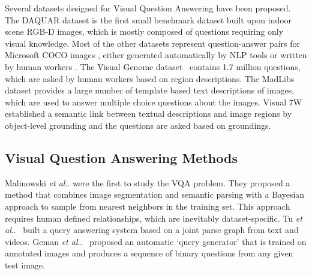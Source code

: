 \documentclass[10pt,journal]{IEEEtran}
\makeatletter
\DeclareRobustCommand\onedot{\futurelet\@let@token\@onedot}
\def\@onedot{\ifx\@let@token.\else.\null\fi\xspace}
\def\etal{\emph{et al}\onedot}
\def\bluetext{}
\makeatother
\begin{document}
Several datasets designed for Visual Question Answering have been proposed. The DAQUAR \cite{malinowski2014towards}
dataset is the first small benchmark dataset built upon indoor scene RGB-D images, which is mostly composed of questions requiring only visual knowledge. Most of the other datasets \cite{antol2015vqa,gao2015you,Yu_2015_ICCV,ren2015image,zhu2015visual7w} represent question-answer pairs for Microsoft COCO images \cite{lin2014microsoft}, either generated automatically by NLP tools \cite{ren2015image} or written by human workers \cite{antol2015vqa,gao2015you}. \bluetext{The Visual Genome dataset~\cite{krishnavisualgenome} contains 1.7 million questions, which are asked by human workers based on region descriptions. }The MadLibs dataset \cite{Yu_2015_ICCV} provides a large number of template based text descriptions of images, which are used to answer multiple choice questions about the images. Visual 7W  \cite{zhu2015visual7w} established a semantic link between textual descriptions and image regions by object-level grounding and the questions are asked based on groundings.

\subsection{Visual Question Answering Methods}
Malinowski \etal \cite{malinowski2014multi}
were
the first to study the VQA problem. They proposed a method that combines image segmentation and semantic parsing with a Bayesian approach to sample from nearest neighbors in the training set. This approach requires human defined relationships, which are inevitably dataset-specific. Tu \etal~\cite{tu2014joint} built a query answering system based on a joint parse graph from text and videos. Geman \etal~\cite{geman2015visual} proposed an automatic `query generator' that is trained on annotated images and produces a sequence of binary questions from any given test image.
\end{document}
